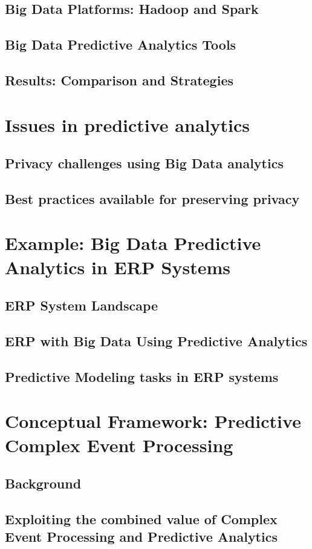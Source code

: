 \documentclass[runningheads]{llncs}
\begin{document}
\subsection{Big Data Platforms: Hadoop and Spark}
\subsection{Big Data Predictive Analytics Tools}
\subsection{Results: Comparison and Strategies}
\section{Issues in predictive analytics}
\subsection{Privacy challenges using Big Data analytics}
\subsection{Best practices available for preserving privacy}
\section{Example: Big Data Predictive Analytics in ERP Systems}
\subsection{ERP System Landscape}
\subsection{ERP with Big Data Using Predictive Analytics}
\subsection{Predictive Modeling tasks in ERP systems}
\section{Conceptual Framework: Predictive Complex Event Processing}
\subsection{Background}
\subsection{Exploiting the combined value of Complex Event Processing and Predictive Analytics}
\end{document}

